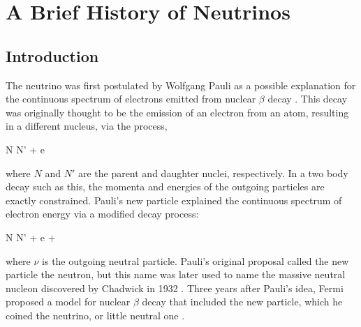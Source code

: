 
\chapter{A Brief History of Neutrinos}
\label{ch:Hist}


\section{Introduction}
\label{sec:HistIntro}

The neutrino was first postulated by Wolfgang Pauli as a possible explanation for the continuous spectrum of electrons emitted from nuclear $\beta$ decay \cite{ref:Pauli}. This decay was originally thought to be the emission of an electron from an atom, resulting in a different nucleus, via the process,

\beq
N \rightarrow N' + e
\label{eq:BetaWrong}
\eeq

\n where $N$ and $N'$ are the parent and daughter nuclei, respectively. In a two body decay such as this, the momenta and energies of the outgoing particles are exactly constrained. Pauli's new particle explained the continuous spectrum of electron energy via a modified decay process:

\beq
N \rightarrow N' + e + \nu
\label{eq:BetaRight}
\eeq

\n where $\nu$ is the outgoing neutral particle. Pauli's original proposal called the new particle the neutron, but this name was later used to name the massive neutral nucleon discovered by Chadwick in 1932 \cite{ref:Chadwick}. Three years after Pauli's idea, Fermi proposed a model for nuclear $\beta$ decay that included the new particle, which he coined the neutrino, or little neutral one \cite{ref:Fermi}.

